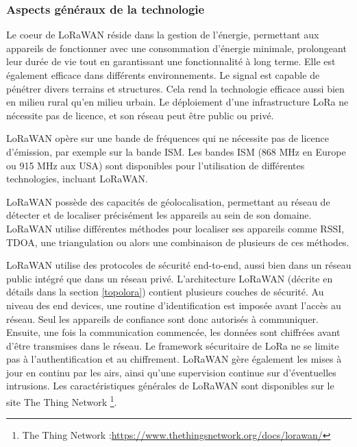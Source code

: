 \subsubsection{Aspects généraux de la technologie}

Le coeur de LoRaWAN réside dans la gestion de l'énergie, permettant aux appareils de fonctionner avec une consommation d'énergie minimale, prolongeant leur durée de vie tout en garantissant une fonctionnalité à long terme. Elle est également efficace dans différents environnements. Le signal est capable de pénétrer divers terrains et structures. Cela rend la technologie efficace aussi bien en milieu rural qu'en milieu urbain.
Le déploiement d'une infrastructure \ac{LoRa} ne nécessite pas de licence, et son réseau peut être public ou privé.

\vspace{0.1cm}

LoRaWAN opère sur une bande de fréquences qui ne nécessite pas de licence d'émission, par exemple sur la bande \ac{ISM}. Les bandes \ac{ISM} (868 MHz en Europe ou 915 MHz aux USA) sont disponibles pour l'utilisation de différentes technologies, incluant LoRaWAN.

\vspace{0.1cm}

LoRaWAN possède des capacités de géolocalisation, permettant au réseau de détecter et de localiser précisément les appareils au sein de son domaine. LoRaWAN utilise différentes méthodes pour localiser ses appareils comme \ac{RSSI}, \ac{TDOA}, une triangulation ou alors une combinaison de plusieurs de ces méthodes.

\vspace{0.1cm}

LoRaWAN utilise des protocoles de sécurité end-to-end, aussi bien dans un réseau public intégré que dans un réseau privé. L'architecture LoRaWAN (décrite en détails dans la section \ref{topolora}) contient plusieurs couches de sécurité. Au niveau des end devices, une routine d'identification est imposée avant l'accès au réseau. Seul les appareils de confiance sont donc autorisés à communiquer. Ensuite, une fois la communication commencée, les données sont chiffrées avant d'être transmises dans le réseau. Le framework sécuritaire de \ac{LoRa} ne se limite pas à l'authentification et au chiffrement. LoRaWAN gère également les mises à jour en continu par les airs, ainsi qu'une supervision continue sur d'éventuelles intrusions. Les caractéristiques générales de LoRaWAN sont disponibles sur le site The Thing Network \footnote{The Thing Network :\href{https://www.thethingsnetwork.org/docs/lorawan/}{https://www.thethingsnetwork.org/docs/lorawan/}}.

